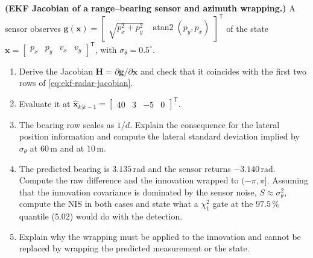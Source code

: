 \begin{prob}\label{prob:ch03:5}
\textbf{(EKF Jacobian of a range--bearing sensor and azimuth wrapping.)} A sensor observes $\mathbf{g}(\mathbf{x})=\begin{bmatrix}\sqrt{p_x^{2}+p_y^{2}} & \operatorname{atan2}(p_y,p_x)\end{bmatrix}^{\mathsf T}$ of the state $\mathbf{x}=\begin{bmatrix}p_x&p_y&v_x&v_y\end{bmatrix}^{\mathsf T}$, with $\sigma_\theta=0.5^{\circ}$.
\begin{enumerate}
\item[(a)] Derive the Jacobian $\mathbf{H}=\partial\mathbf{g}/\partial\mathbf{x}$ and check that it coincides with the first two rows of \eqref{eq:ekf-radar-jacobian}.
\item[(b)] Evaluate it at $\widehat{\mathbf{x}}_{k|k-1}=\begin{bmatrix}40&3&-5&0\end{bmatrix}^{\mathsf T}$.
\item[(c)] The bearing row scales as $1/d$. Explain the consequence for the lateral position information and compute the lateral standard deviation implied by $\sigma_\theta$ at $60$\,m and at $10$\,m.
\item[(d)] The predicted bearing is $3.135$\,rad and the sensor returns $-3.140$\,rad. Compute the raw difference and the innovation wrapped to $(-\pi,\pi]$. Assuming that the innovation covariance is dominated by the sensor noise, $S\approx\sigma_\theta^{2}$, compute the NIS in both cases and state what a $\chi^{2}_{1}$ gate at the $97.5\,\%$ quantile ($5.02$) would do with the detection.
\item[(e)] Explain why the wrapping must be applied to the innovation and cannot be replaced by wrapping the predicted measurement or the state.
\end{enumerate}
\end{prob}

